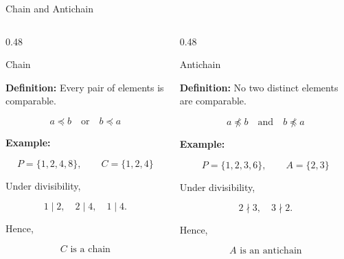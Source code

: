 \documentclass[aspectratio=169,11pt]{beamer}
\begin{document}
\begin{frame}{Chain and Antichain}

\small

\begin{columns}[T]

\begin{column}{0.48\textwidth}

\begin{block}{Chain}

\textbf{Definition:} Every pair of elements is comparable.

\[
a\preceq b\quad\text{or}\quad b\preceq a
\]

\textbf{Example:}

\[
P=\{1,2,4,8\},\qquad C=\{1,2,4\}
\]

Under divisibility,

\[
1\mid2,\quad2\mid4,\quad1\mid4.
\]

Hence,

\[
\boxed{C\text{ is a chain}}
\]

\end{block}

\end{column}


\begin{column}{0.48\textwidth}

\begin{block}{Antichain}

\textbf{Definition:} No two distinct elements are comparable.

\[
a\npreceq b\quad\text{and}\quad b\npreceq a
\]

\textbf{Example:}

\[
P=\{1,2,3,6\},\qquad A=\{2,3\}
\]

Under divisibility,

\[
2\nmid3,\quad3\nmid2.
\]

Hence,

\[
\boxed{A\text{ is an antichain}}
\]

\end{block}

\end{column}

\end{columns}

\end{frame}
\end{document}
